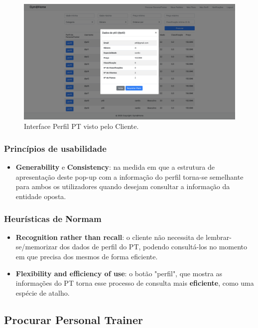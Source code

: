 \begin{figure}[H]
    \centering
    \includegraphics[scale=0.25]{images/interfaces/client_perfil_pt.png}
    \caption{Interface Perfil PT visto pelo Cliente.}
    \label{fig:interfaceperfilptbycliente}
\end{figure}

\subsubsection{Princípios de usabilidade}
\begin{itemize}
    \item \textbf{Generability} e \textbf{Consistency}: na medida em que a estrutura de apresentação deste pop-up com a informação do perfil torna-se semelhante para ambos os utilizadores quando desejam consultar a informação da entidade oposta.
\end{itemize}

\subsubsection{Heurísticas de Normam}
\begin{itemize}
    \item \textbf{Recognition rather than recall}: o cliente não necessita de lembrar-se/memorizar dos dados de perfil do PT, podendo consultá-los no momento em que precisa dos mesmos de forma eficiente.
    \item \textbf{Flexibility and efficiency of use}: o botão "perfil", que mostra as informações do PT torna esse processo de consulta mais \textbf{eficiente}, como uma espécie de atalho.
\end{itemize}

\subsection{Procurar Personal Trainer}
\label{subsec:procurarpersonaltrainer}

